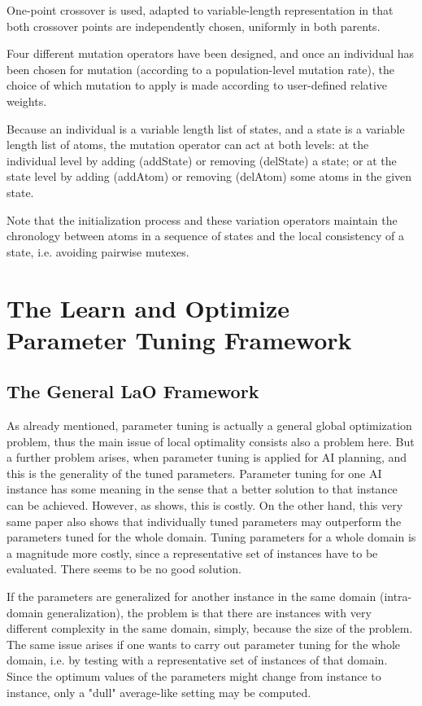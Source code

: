 \documentclass{article}
\begin{document}
One-point crossover is used, adapted to variable-length representation in that both crossover points are independently chosen, uniformly in both parents.

Four different mutation operators have been designed, and once an individual has been chosen for mutation (according to a population-level mutation rate), the choice of which mutation to apply is made according to user-defined relative weights. 

Because an individual is a variable length list of states, and a state is a variable length list of atoms, the mutation 
operator can act at both levels: at the individual level by adding (addState) or removing (delState) 
a state; or at the state level by adding (addAtom) or removing (delAtom) some atoms in the given state. 

Note that the initialization process and these variation operators maintain the chronology between atoms in a sequence of states and the local consistency of a state, i.e. avoiding pairwise mutexes.

\section{The Learn and Optimize Parameter Tuning Framework}
\label{section:LaO}

\subsection{The General LaO Framework}

As already mentioned, parameter tuning is actually a general global optimization problem, thus the main issue of local optimality consists also a problem here. But a further problem arises, when parameter tuning is applied for AI planning, and this is the generality of the tuned parameters. Parameter tuning for one AI instance has some meaning in the sense that a better solution to that instance can be achieved. However, as \cite{BibGECCO:2010} shows, this is costly. On the other hand, this very same paper also shows that individually tuned parameters may outperform the parameters tuned for the whole domain. Tuning parameters for a whole domain is a magnitude more costly, since a representative set of instances have to be evaluated. There seems to be no good solution.

If the parameters are generalized for another instance in the same domain (intra-domain generalization), the problem is that there are instances with very different complexity in the same domain, simply, because the size of the problem. The same issue arises if one wants to carry out parameter tuning for the whole domain, i.e. by testing with a representative set of instances of that domain. Since the optimum values of the parameters might change from instance to instance, only a "dull" average-like setting may be computed.
\end{document}
